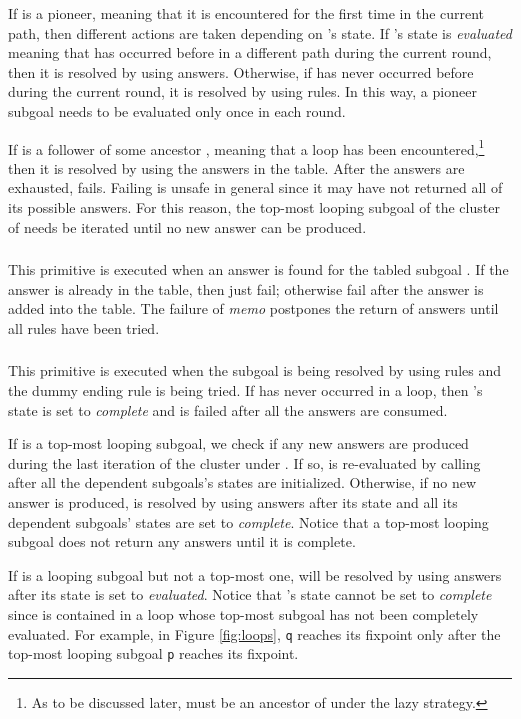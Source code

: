 \documentclass{tlp}
\begin{document}
If  is a pioneer, meaning that it is encountered for the first time in the current path, then different actions are taken depending on 's state. If 's state is {\it evaluated} meaning that  has occurred before in a different path during the current round, then it is resolved by using answers. Otherwise, if  has never occurred before during the current round, it is resolved by using rules. In this way, a pioneer subgoal needs to be evaluated only once in each round.

If  is a follower of some ancestor , meaning that a loop has been encountered,\footnote{As to be discussed later,  must be an ancestor of  under the lazy strategy.} then it is resolved by using the answers in the table. After the answers are exhausted,  fails. Failing  is unsafe in general since it may have not returned all of its possible answers. For this reason, the top-most looping subgoal of the cluster of  needs be iterated until no new answer can be produced.

\subsubsection{}
This primitive is executed when an answer is found for the tabled subgoal . If the answer  is already in the table, then just fail; otherwise fail after the answer is added into the table. The failure of {\it memo} postpones the return of answers until all rules have been tried.

\subsubsection{\label{sub:evaluated}}
This primitive is executed when the subgoal  is being resolved by using rules and the dummy ending rule is being tried. If  has never occurred in a loop, then 's state is set to {\it complete} and  is failed after all the answers are consumed. 

If  is a top-most looping subgoal, we check if any new answers are produced during the last iteration of the cluster under . If so,  is re-evaluated by calling  after all the dependent subgoals's states are initialized. Otherwise, if no new answer is produced,  is resolved by using answers after its state and all its dependent subgoals' states are set to {\it complete}. Notice that a top-most looping subgoal does not return any answers until it is complete.

If  is a looping subgoal but not a top-most one,  will be resolved by using answers after its state is set to {\it evaluated}. Notice that 's state cannot be set to {\it complete} since  is contained in a loop whose top-most subgoal has not been completely evaluated. For example, in Figure \ref{fig:loops}, {\tt q} reaches its fixpoint only after the top-most looping subgoal {\tt p} reaches its fixpoint. 
\end{document}
